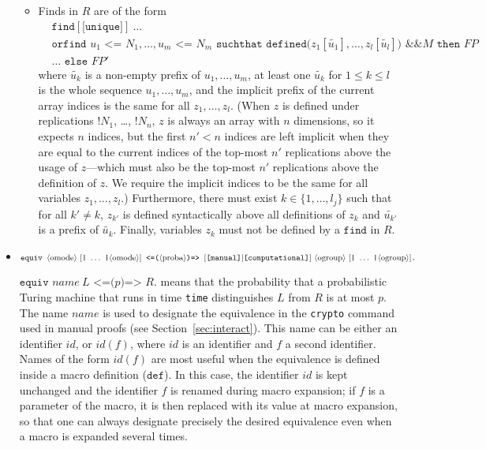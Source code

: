 \begin{itemize}
\begin{itemize}
\item %
\newcommand{\tup}[1]{\widetilde{#1}}

Finds in $R$ are of the form
\[\begin{split}
&\texttt{find}[\texttt{[unique]}]\ \ldots\\
&\texttt{orfind }u_1 \texttt{ <= } N_1, \ldots, u_m \texttt{ <= }N_m
\texttt{ suchthat defined(}z_1[\tup{u_1}], \ldots, z_l[\tup{u_l}]\texttt{) \&\& }M\texttt{ then }\mathit{FP}\\
&\ldots \texttt{ else }\mathit{FP}'
\end{split}\]
where $\tup{u_k}$ is a non-empty
prefix of $u_1, \ldots, u_m$, at least one $\tup{u_k}$ for $1 \leq
k \leq l$ is the whole sequence $u_1, \ldots, u_m$,
and the implicit prefix of the current array indices is the same
for all $z_1, \ldots, z_l$.
%
(When $z$ is defined under replications $\texttt{!}N_1$, \ldots,
$\texttt{!}N_n$, $z$ is always an array with $n$ dimensions, so it
expects $n$ indices, but the first $n'<n$ indices are left implicit
when they are equal to the current indices of the top-most $n'$ replications
above the usage of $z$---which must also be the top-most $n'$
replications above the definition of $z$. We require the implicit
indices to be the same for all variables $z_1, \ldots, z_l$.)
Furthermore, there must exist $k \in \{ 1, \ldots, l_j\}$ such that
for all $k' \neq k$, $z_{k'}$ is defined syntactically above all
definitions of $z_k$ and $\tup{u_{k'}}$ is a prefix of $\tup{u_k}$. 
%
Finally, variables $z_k$ must not be defined by a $\texttt{find}$ in $R$.


\end{itemize}
\else
\item $\texttt{equiv }\nonterm{omode}\ [\texttt{|}\ \ldots\ \texttt{|}\nonterm{omode}]\texttt{ <=(}\nonterm{proba}\texttt{)=> }
[\texttt{[manual]}| \texttt{[computational]}]\ \nonterm{ogroup}\ [\texttt{|}\ \ldots\ \texttt{|}\nonterm{ogroup}]\texttt{.}$

$\texttt{equiv }\mathit{name}\ L\texttt{ <=(}p\texttt{)=> }R\texttt{.}$ means that the
probability that a probabilistic Turing machine that runs in time
{\tt time} distinguishes $L$ from $R$ is at most $p$. The name $\mathit{name}$
is used to designate the equivalence in the \texttt{crypto} command used in manual proofs (see Section~\ref{sec:interact}). This name can be either an identifier $\mathit{id}$, or $\mathit{id}(f)$, where $\mathit{id}$ is an identifier and $f$ a second identifier. Names of the form $\mathit{id}(f)$ are most useful when the equivalence is defined inside a macro definition ($\texttt{def}$). In this case, the identifier $\mathit{id}$ is kept unchanged and the identifier $f$ is renamed during macro expansion; if $f$ is a parameter of the macro, it is then replaced with its value at macro expansion, so that one can always designate precisely the desired equivalence even when a macro is expanded several times.


\end{itemize}
